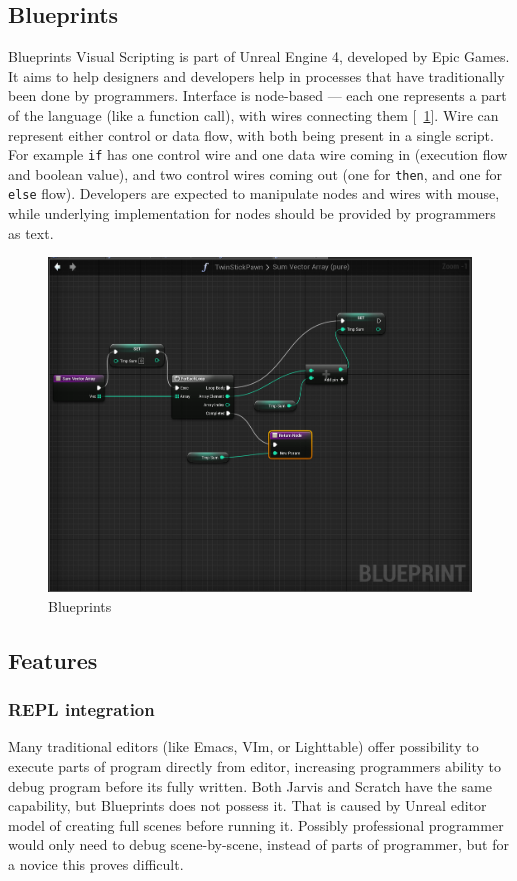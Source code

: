 \documentclass[11pt]{scrartcl}
\newcommand*{\figref}[1]{[\textbf{\figurename}~\ref{#1}]}
\begin{document}
\subsection{Blueprints}
Blueprints Visual Scripting is part of Unreal Engine 4, developed by Epic Games.
It aims to help designers and developers help in processes that have
traditionally been done by programmers.
Interface is node-based --- each one represents a part of the language (like a
function call), with wires connecting them \figref{fig:blueprints}.
Wire can represent either control or data flow, with both being present in a
single script.
For example \lstinline|if| has one control wire and one data wire coming in (execution
flow and boolean value), and two control wires coming out (one for \lstinline|then|, and
one for \lstinline|else| flow).
Developers are expected to manipulate nodes and wires with mouse, while
underlying implementation for nodes should be provided by programmers as text.

\begin{figure}[hbt]
  \centering
  \includegraphics[scale=0.3]{img/b-wires}
  \caption{Blueprints}
\label{fig:blueprints}
\end{figure}

\subsection{Features}

\subsubsection*{REPL integration}
Many traditional editors (like Emacs, VIm, or Lighttable) offer possibility to
execute parts of program directly from editor, increasing programmers ability to
debug program before its fully written.
Both Jarvis and Scratch have the same capability, but Blueprints does not
possess it. That is caused by Unreal editor model of creating full scenes before
running it. Possibly professional programmer would only need to debug
scene-by-scene, instead of parts of programmer, but for a novice this proves
difficult.
\end{document}
